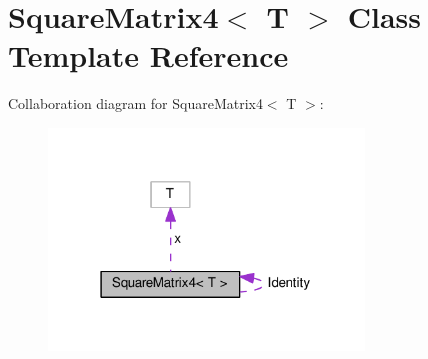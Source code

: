 \hypertarget{class_square_matrix4}{}\section{Square\+Matrix4$<$ T $>$ Class Template Reference}
\label{class_square_matrix4}


Collaboration diagram for Square\+Matrix4$<$ T $>$\+:
\nopagebreak
\begin{figure}[H]
\begin{center}
\leavevmode
\includegraphics[width=238pt]{class_square_matrix4__coll__graph}
\end{center}
\end{figure}
